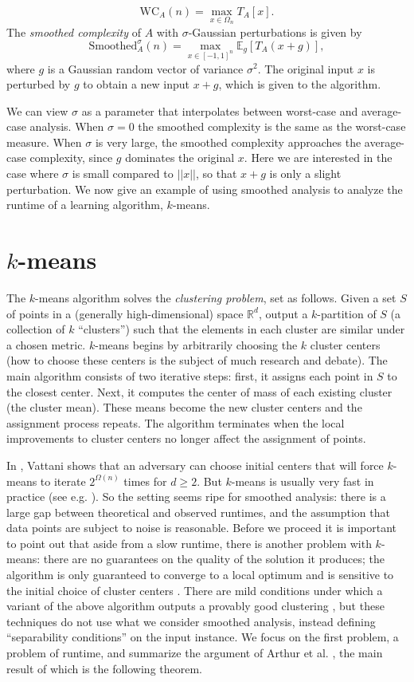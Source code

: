 \documentclass[11pt]{article}
\theoremstyle{definition}
\begin{document}
\begin{multicols}{2}
$$\mbox{WC}_A(n) = \max_{x \in \Omega_n}T_A[x].$$
The \emph{smoothed complexity} of $A$ with $\sigma$-Gaussian perturbations is given by
$$\mbox{Smoothed}_A^{\sigma}(n) = \max_{x\in [-1,1]^n}
\mathbb{E}_g[T_A(x + g)],$$ where $g$ is a Gaussian random vector of
variance $\sigma^2$. The original input $x$ is perturbed by $g$ to
obtain a new input $x + g$, which is given to the algorithm.

We can view $\sigma$ as a parameter that interpolates between
worst-case and average-case analysis. When $\sigma = 0$ the smoothed
complexity is the same as the worst-case measure. When $\sigma$ is
very large, the smoothed complexity approaches the average-case
complexity, since $g$ dominates the original $x$. Here we are
interested in the case where $\sigma$ is small compared to $||x||$, so
that $x + g$ is only a slight perturbation. We now give an example of
using smoothed analysis to analyze the runtime of a learning
algorithm, $k$-means.

\section{$k$-means}
The $k$-means algorithm solves the \emph{clustering problem}, set as
follows. Given a set $S$ of points in a (generally high-dimensional)
space $\mathbb{R}^d$, output a $k$-partition of $S$ (a collection of
$k$ ``clusters'') such that the elements in each cluster are similar
under a chosen metric. $k$-means begins by arbitrarily choosing the
$k$ cluster centers (how to choose these centers is the subject of
much research and debate). The main algorithm consists of two
iterative steps: first, it assigns each point in $S$ to the closest
center. Next, it computes the center of mass of each existing cluster
(the cluster mean). These means become the new cluster centers and the
assignment process repeats. The algorithm terminates when the local
improvements to cluster centers no longer affect the assignment of
points.

In \cite{KMworstcase}, Vattani shows that an adversary can choose
initial centers that will force $k$-means to iterate $2^{\Omega(n)}$
times for $d \ge 2$. But $k$-means is usually very fast in practice
(see e.g. \cite{kmeansfast}). So the setting seems ripe for smoothed
analysis: there is a large gap between theoretical and observed
runtimes, and the assumption that data points are subject to noise is
reasonable. Before we proceed it is important to point out that aside
from a slow runtime, there is another problem with $k$-means: there
are no guarantees on the quality of the solution it produces; the
algorithm is only guaranteed to converge to a local optimum and is
sensitive to the initial choice of cluster centers
\cite{kmeanssensitive}. There are mild conditions under which a
variant of the above algorithm outputs a provably good clustering
\cite{kmeansprovable}, but these techniques do not use what we
consider smoothed analysis, instead defining ``separability
conditions'' on the input instance. We focus on the first problem, a
problem of runtime, and summarize the argument of Arthur et
al. \cite{SAkmeans}, the main result of which is the following
theorem.


\end{multicols}
\end{document}
